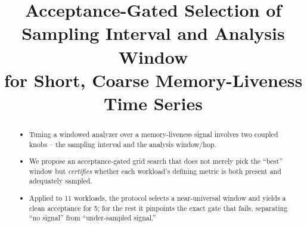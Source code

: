 \documentclass[conference]{IEEEtran}
\title{Acceptance-Gated Selection of Sampling Interval and Analysis Window\\
for Short, Coarse Memory-Liveness Time Series}
\author{\IEEEauthorblockN{TODO Author list}
\IEEEauthorblockA{TODO Affiliation}}
\begin{document}
\maketitle

\begin{abstract}
\begin{itemize}
  \item Tuning a windowed analyzer over a memory-liveness signal involves two
        coupled knobs -- the sampling interval and the analysis window/hop.
  \item We propose an acceptance-gated grid search that does not merely pick the
        ``best'' window but \emph{certifies} whether each workload's defining
        metric is both present and adequately sampled.
  \item Applied to 11 workloads, the protocol selects a near-universal window
        and yields a clean acceptance for 5; for the rest it pinpoints the exact
        gate that fails, separating ``no signal'' from ``under-sampled signal.''
\end{itemize}
\end{abstract}
\end{document}
